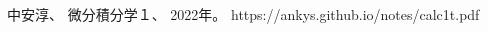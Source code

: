 
% 
% 

\begin{thebibliography}{10}

中安淳、
微分積分学１、
2022年。
https://ankys.github.io/notes/calc1t.pdf

\end{thebibliography}
